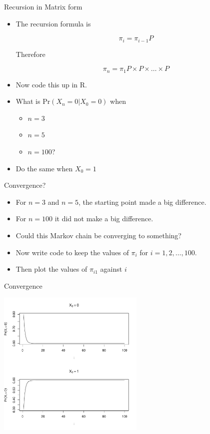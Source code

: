\documentclass[10pt]{beamer}
\begin{document}
\begin{frame}{Recursion in Matrix form}
\begin{itemize}
\item The recursion formula is

\begin{equation}
\pi_{i}=\pi_{i-1}P
\end{equation}

Therefore

\begin{equation}
\pi_{n}=\pi_{1}P\times P\times\ldots\times P
\end{equation}

\item Now code this up in R.

\item What is $\mbox{Pr}(X_n=0|X_0=0)$ when
\begin{itemize}
\item $n=3$
\item $n=5$
\item $n=100$?
\end{itemize}

\item Do the same when $X_0=1$
\end{itemize}
\end{frame}
\begin{frame}{Convergence?}
\begin{itemize}
\item For $n=3$ and $n=5$, the starting point made a big difference.

\item For $n=100$ it did not make a big difference.

\item Could this Markov chain be converging to something?

\item Now write code to keep the values of $\pi_i$ for $i=1,2,\ldots,100$.

\item Then plot the values of $\pi_{i1}$ against $i$
\end{itemize}
\end{frame}
\begin{frame}{Convergence}
\begin{center}
\includegraphics[height=7cm]{Pics/MarkovConv.pdf}
\end{center}
\end{frame}
\end{document}
